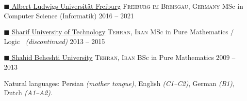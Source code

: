 \documentclass[10pt,a4paper]{article}
\newcommand{\colorsquare}[1]{\textcolor{#1}{$\blacksquare$}}
\begin{document}
\spacedhrule{-0.2em}{-0.4em}


\headedsection
  {\href{http://www.uni-freiburg.de/}{\colorsquare{carolinablue} Albert-Ludwigs-Universität Freiburg}}
  {\textsc{Freiburg im Breisgau, Germany}} {%
  \headedsubsection
    {MSc in Computer Science (Informatik)}
    {2016 -- 2021}
    {%
    }
}

\headedsection
  {\href{http://www.en.sharif.edu/}{\colorsquare{amethyst} Sharif University of Technology}}
  {\textsc{Tehran, Iran}} {%
  \headedsubsection
    {MSc in Pure Mathematics / Logic \textnormal{\textit{~(discontinued)}}}
    {2013 -- 2015} 
    {%
    }
}

\headedsection
  {\href{http://en.sbu.ac.ir/}{\colorsquare{brickred} Shahid Beheshti University}}
  {\textsc{Tehran, Iran}} {%
  \headedsubsection
    {BSc in Pure Mathematics}
    {2009 -- 2013} 
    {
    }
}



\spacedhrule{0.5em}{-0.4em}



\vspace{0.5em}
\inlineheadsection
  {Natural languages:}
  {Persian \emph{(mother tongue)}, English \emph{(C1--C2)}, German \emph{(B1)}, Dutch \emph{(A1--A2)}.
  }

\end{document}

